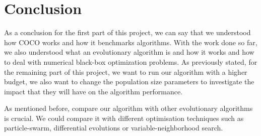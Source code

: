 \documentclass{article}
\begin{document}
\section{Conclusion}
As a conclusion for the first part of this project, we can say that we understood how COCO works and how it benchmarks algorithms. With the work done so far, we also understood what an evolutionary algorithm is and how it works and how to deal with numerical black-box optimization problems. 
As previously stated, for the remaining part of this project, we want to run our algorithm with a higher budget, we also want to change the population size parameters to investigate the impact that they will have on the algorithm performance.


As mentioned before, compare our algorithm with other evolutionary algorithms is crucial. We could compare it with different optimisation techniques such as particle-swarm, differential evolutions or variable-neighborhood search.








\end{document}
